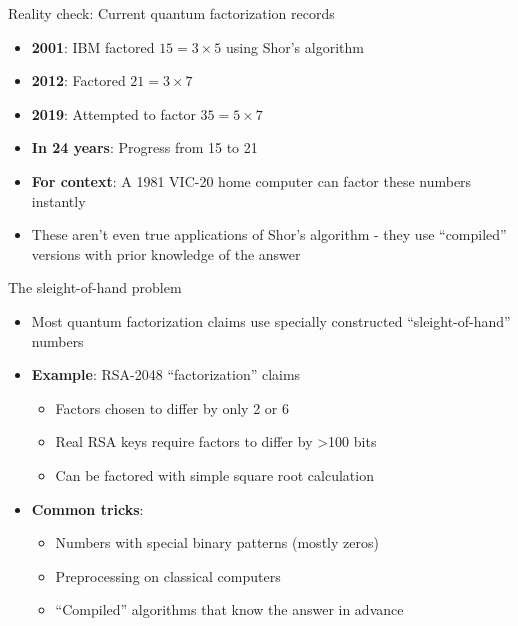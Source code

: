 \documentclass[aspectratio=169, lualatex, handout]{beamer}
\begin{document}
\begin{frame}{Reality check: Current quantum factorization records}
	\begin{itemize}
		\item \textbf{2001}: IBM factored $15 = 3 \times 5$ using Shor's algorithm
		\item \textbf{2012}: Factored $21 = 3 \times 7$
		\item \textbf{2019}: Attempted to factor $35 = 5 \times 7$
		\item \textbf{In 24 years}: Progress from 15 to 21
		\item \textbf{For context}: A 1981 VIC-20 home computer can factor these numbers instantly
		\item These aren't even true applications of Shor's algorithm - they use ``compiled'' versions with prior knowledge of the answer
	\end{itemize}
\end{frame}

\begin{frame}{The sleight-of-hand problem}
	\begin{itemize}
		\item Most quantum factorization claims use specially constructed ``sleight-of-hand'' numbers
		\item \textbf{Example}: RSA-2048 ``factorization'' claims
		      \begin{itemize}
			      \item Factors chosen to differ by only 2 or 6
			      \item Real RSA keys require factors to differ by >100 bits
			      \item Can be factored with simple square root calculation
		      \end{itemize}
		\item \textbf{Common tricks}:
		      \begin{itemize}
			      \item Numbers with special binary patterns (mostly zeros)
			      \item Preprocessing on classical computers
			      \item ``Compiled'' algorithms that know the answer in advance
		      \end{itemize}
	\end{itemize}
\end{frame}
\end{document}
